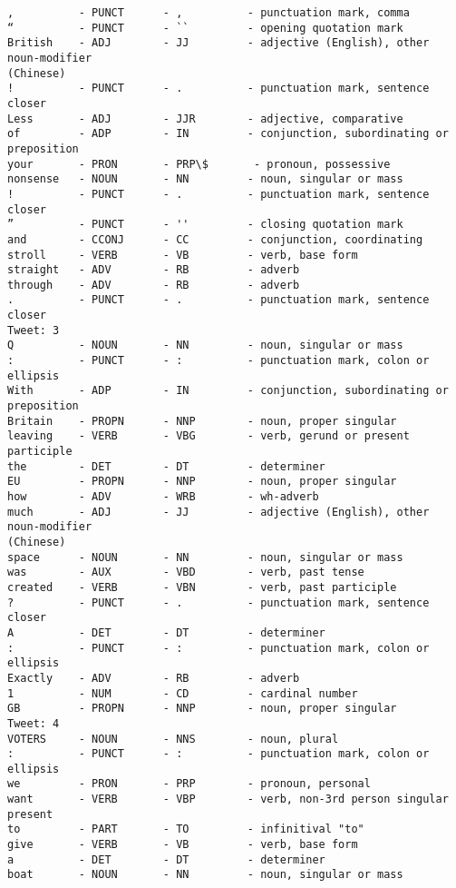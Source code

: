 \documentclass[11pt]{article}
\begin{document}
\begin{Verbatim}[commandchars=\\\{\}]
,          - PUNCT      - ,          - punctuation mark, comma
“          - PUNCT      - ``         - opening quotation mark
British    - ADJ        - JJ         - adjective (English), other noun-modifier
(Chinese)
!          - PUNCT      - .          - punctuation mark, sentence closer
Less       - ADJ        - JJR        - adjective, comparative
of         - ADP        - IN         - conjunction, subordinating or preposition
your       - PRON       - PRP\$       - pronoun, possessive
nonsense   - NOUN       - NN         - noun, singular or mass
!          - PUNCT      - .          - punctuation mark, sentence closer
”          - PUNCT      - ''         - closing quotation mark
and        - CCONJ      - CC         - conjunction, coordinating
stroll     - VERB       - VB         - verb, base form
straight   - ADV        - RB         - adverb
through    - ADV        - RB         - adverb
.          - PUNCT      - .          - punctuation mark, sentence closer
Tweet: 3
Q          - NOUN       - NN         - noun, singular or mass
:          - PUNCT      - :          - punctuation mark, colon or ellipsis
With       - ADP        - IN         - conjunction, subordinating or preposition
Britain    - PROPN      - NNP        - noun, proper singular
leaving    - VERB       - VBG        - verb, gerund or present participle
the        - DET        - DT         - determiner
EU         - PROPN      - NNP        - noun, proper singular
how        - ADV        - WRB        - wh-adverb
much       - ADJ        - JJ         - adjective (English), other noun-modifier
(Chinese)
space      - NOUN       - NN         - noun, singular or mass
was        - AUX        - VBD        - verb, past tense
created    - VERB       - VBN        - verb, past participle
?          - PUNCT      - .          - punctuation mark, sentence closer
A          - DET        - DT         - determiner
:          - PUNCT      - :          - punctuation mark, colon or ellipsis
Exactly    - ADV        - RB         - adverb
1          - NUM        - CD         - cardinal number
GB         - PROPN      - NNP        - noun, proper singular
Tweet: 4
VOTERS     - NOUN       - NNS        - noun, plural
:          - PUNCT      - :          - punctuation mark, colon or ellipsis
we         - PRON       - PRP        - pronoun, personal
want       - VERB       - VBP        - verb, non-3rd person singular present
to         - PART       - TO         - infinitival "to"
give       - VERB       - VB         - verb, base form
a          - DET        - DT         - determiner
boat       - NOUN       - NN         - noun, singular or mass

\end{Verbatim}
\end{document}
